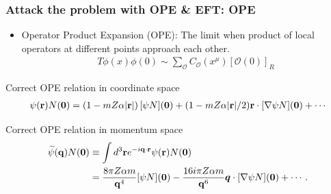 \begin{frame}
	\frametitle{Attack the problem with OPE \& EFT: OPE}

	\begin{itemize}
		\item Operator Product Expansion (OPE): The limit when product of local operators at different points approach each other.
				\begin{align}
					T\phi(x)\phi(0)\sim\sum_{\mathcal{O}}C_{\mathcal{O}}(x^{\mu})[\mathcal{O}(0)]_R
				\end{align}
	\end{itemize}
	\onslide<+->
	\begin{block}{\large Correct OPE relation in coordinate space}
		\begin{align*}
			\psi({\bf r})N({\bf 0})=(1-mZ\alpha |{\bf r}|)\,[\psi N]({\bf 0})
			+ (1-mZ\alpha |{\bf r}|/2){\bf r}\cdot [{\bf\nabla}\psi N]({\bf 0})+\cdots
		\end{align*}
	\end{block}

	\begin{block}{\large Correct OPE relation in momentum space}
		\begin{align*}
			\widetilde\psi({\bf q})N({\bf 0}) & \equiv \int d^3 {\bf r}
			e^{-i {\bf q}\cdot {\bf r}} \psi({\bf r})N({\bf 0})\nonumber\\&= \frac{8\pi Z\alpha m}{{\bf q}^4} [\psi N]({\bf 0})-\frac{16 i \pi Z\alpha m}{{\bf q}^6}\bm{q}
			\cdot [{\bf\nabla}\psi N] ({\bf 0})+\cdots.
		\end{align*}
	\end{block}
\end{frame}



